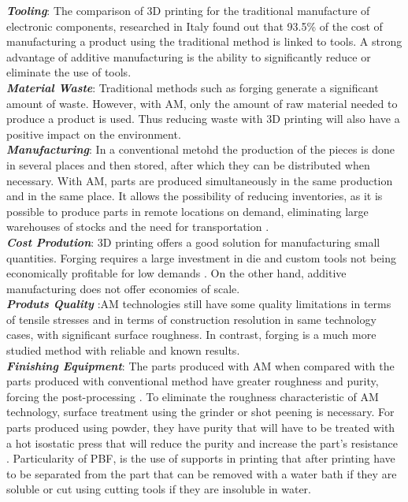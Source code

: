  \textbf{\emph{Tooling}}: The comparison of 3D printing for the traditional manufacture of electronic components, researched in Italy found out that 93.5\% of the cost of manufacturing a product using the traditional method is linked to tools. \cite{boubekri2015economics}
A strong advantage of additive manufacturing is the ability to significantly reduce or eliminate the use of tools.
 \vspace{20}\\
 \textbf{\emph{Material Waste}}: Traditional methods such as forging generate a significant amount of waste. However, with AM, only the amount of raw material needed to produce a product is used.
Thus reducing waste with 3D printing will also have a positive impact on the environment. \cite{boubekri2015economics}
 \vspace{20}\\
 \textbf{\emph{Manufacturing}}:
In a conventional metohd the production of the pieces is done in several places and then stored, after which they can be distributed when necessary. With AM, parts are produced simultaneously in the same production and in the same place. It allows the possibility of reducing inventories, as it is possible to produce parts in remote locations on demand, eliminating large warehouses of stocks and the need for transportation \cite{tofail2018additive}\cite{pereira2019comparison}.
 \vspace{20}\\
 \textbf{\emph{Cost Prodution}}: 3D printing offers a good solution for manufacturing small quantities. Forging requires a large investment in die and custom tools not being economically profitable for low demands \cite{boubekri2015economics}.
On the other hand, additive manufacturing does not offer economies of scale. \cite{boubekri2015economics}
 \vspace{20}\\
 \textbf{\emph{Produts Quality }}:AM technologies still have some quality limitations in terms of tensile stresses and in terms of construction resolution in same technology cases, with significant surface roughness. In contrast, forging is a much more studied method with reliable and known results\cite{tofail2018additive}.
 \vspace{20}\\
  \textbf{\emph{Finishing Equipment}}: The parts produced with AM when compared with the parts produced with conventional method have greater roughness and purity, forcing the post-processing \cite{AMD}. To eliminate the roughness characteristic of AM technology, surface treatment using the grinder or shot peening is necessary. For parts produced using powder, they have purity that will have to be treated with a hot isostatic press that will reduce the purity and increase the part's resistance \cite{loh1992overview}. Particularity of \ac{PBF}, is the use of supports in printing that after printing have to be separated from the part that can be removed with a water bath if they are soluble or cut using cutting tools if they are insoluble in water.\par
 \vspace{20}
 
